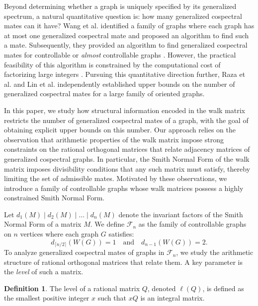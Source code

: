 \documentclass[12pt]{article}
\theoremstyle{plain}
\theoremstyle{definition}
\newtheorem{definition}{Definition}[section]
\begin{document}
Beyond determining whether a graph is uniquely specified by its generalized spectrum, a natural quantitative question is: how many generalized cospectral mates can it have? Wang et al. \cite{wang2023graphs} identified a family of graphs where each graph has at most one generalized cospectral mate and proposed an algorithm to find such a mate. Subsequently, they provided an algorithm to find generalized cospectral mates for controllable or {\em almost} controllable graphs \cite{wang2025haemers}. However, the practical feasibility of this algorithm is constrained by the computational cost of factorizing large integers \cite{crandall2005prime}. Pursuing this quantitative direction further, Raza et al. \cite{raza2025upper} and Lin et al. \cite{lin2025upper} independently established upper bounds on the number of generalized cospectral mates for a large family of oriented graphs.

In this paper, we study how structural information encoded in the walk matrix restricts the number of generalized cospectral mates of a graph, with the goal of obtaining explicit upper bounds on this number. Our approach relies on the observation that arithmetic properties of the walk matrix impose strong constraints on the rational orthogonal matrices that relate adjacency matrices of generalized cospectral graphs. In particular, the Smith Normal Form of the walk matrix imposes divisibility conditions that any such matrix must satisfy, thereby limiting the set of admissible mates. Motivated by these observations, we introduce a family of controllable graphs whose walk matrices possess a highly constrained Smith Normal Form.

Let $d_1(M) \mid d_2(M) \mid \dots \mid d_n(M)$ denote the invariant factors of the Smith Normal Form of a matrix $M$. We define $\mathcal{F}_n$ as the family of controllable graphs on $n$ vertices where each graph $G$ satisfies:
\begin{equation}
\label{eqn:Fn}
d_{\lceil n/2 \rceil}(W(G)) = 1 \quad \text{and} \quad d_{n-1}(W(G)) = 2. 
\end{equation}
To analyze generalized cospectral mates of graphs in $\mathcal{F}_n$, we study the arithmetic structure of rational orthogonal matrices that relate them. A key parameter is the {\em level} of such a matrix.

\begin{definition}
The level of a rational matrix $Q$, denoted $\ell(Q)$, is defined as the smallest positive integer $x$ such that $xQ$ is an integral matrix.
\end{definition}
\end{document}
